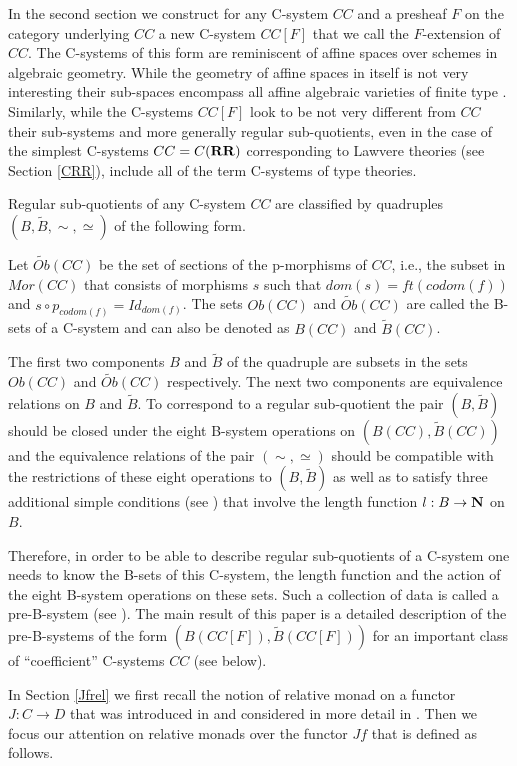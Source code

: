 \documentclass[12pt]{amsart}
\newcommand{\sr}{\rightarrow}
\newcommand{\nn}{{\bf N\rm}}
\newcommand{\nat}{\nn}
\newcommand{\wt}{\widetilde}
\newcommand{\RR}{{\bf RR}}
\begin{document}
In the second section we construct for any C-system $CC$ and a presheaf $F$ on
the category underlying $CC$ a new C-system $CC[F]$ that we call the
$F$-extension of $CC$. The C-systems of this form are reminiscent of affine
spaces over schemes in algebraic geometry. While the geometry of affine spaces
in itself is not very interesting their sub-spaces encompass all affine
algebraic varieties of finite type . Similarly, while the C-systems $CC[F]$
look to be not very different from $CC$ their sub-systems and more generally
regular sub-quotients, even in the case of the simplest C-systems $CC=C(\RR)$
corresponding to Lawvere theories (see Section \ref{CRR}), include all of the
term C-systems of type theories.

Regular sub-quotients of any C-system $CC$ are classified by quadruples
$(B,\wt{B}, \sim,\simeq)$ of the following form.

Let $\wt{Ob}(CC)$ be the set of sections of the p-morphisms of $CC$, i.e., the
subset in $Mor(CC)$ that consists of morphisms $s$ such that
$dom(s)=ft(codom(f))$ and $s\circ p_{codom(f)}=Id_{dom(f)}$.  The sets $Ob(CC)$
and $\wt{Ob}(CC)$ are called the B-sets of a C-system and can also be denoted
as $B(CC)$ and $\wt{B}(CC)$.

The first two components $B$ and $\wt{B}$ of the quadruple are subsets in the
sets $Ob(CC)$ and $\wt{Ob}(CC)$ respectively. The next two components are
equivalence relations on $B$ and $\wt{B}$. To correspond to a regular
sub-quotient the pair $(B,\wt{B})$ should be closed under the eight B-system
operations on $(B(CC),\wt{B}(CC))$ and the equivalence relations of the pair
$(\sim,\simeq)$ should be compatible with the restrictions of these eight
operations to $(B,\wt{B})$ as well as to satisfy three additional simple
conditions (see \cite[Proposition 5.4]{Csubsystems}) that involve the length
function $l:B\sr\nat$ on $B$.

Therefore, in order to be able to describe regular sub-quotients of a C-system
one needs to know the B-sets of this C-system, the length function and the
action of the eight B-system operations on these sets. Such a collection of
data is called a pre-B-system (see \cite{Bsystems}). The main result of this
paper is a detailed description of the pre-B-systems of the form
$(B(CC[F]),\wt{B}(CC[F]))$ for an important class of ``coefficient''
C-systems $CC$ (see below).

In Section \ref{Jfrel} we first recall the notion of relative monad on a
functor $J:C\sr D$ that was introduced in \cite[Def.1, p.~299]{ACU} and
considered in more detail in \cite{ACU2}. Then we focus our attention on
relative monads over the functor $Jf$ that is defined as follows.
\end{document}
